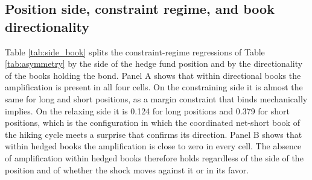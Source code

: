 \documentclass[english, 11pt, oneside]{article}
\begin{document}
\clearpage
\subsection{Position side, constraint regime, and book directionality}
\label{subsec:side_book}
Table \ref{tab:side_book} splits the constraint-regime regressions of Table \ref{tab:asymmetry} by the side of the hedge fund position and by the directionality of the books holding the bond. Panel A shows that within directional books the amplification is present in all four cells. On the constraining side it is almost the same for long and short positions, as a margin constraint that binds mechanically implies. On the relaxing side it is 0.124 for long positions and 0.379 for short positions, which is the configuration in which the coordinated net-short book of the hiking cycle meets a surprise that confirms its direction. Panel B shows that within hedged books the amplification is close to zero in every cell. The absence of amplification within hedged books therefore holds regardless of the side of the position and of whether the shock moves against it or in its favor. \\
\end{document}
